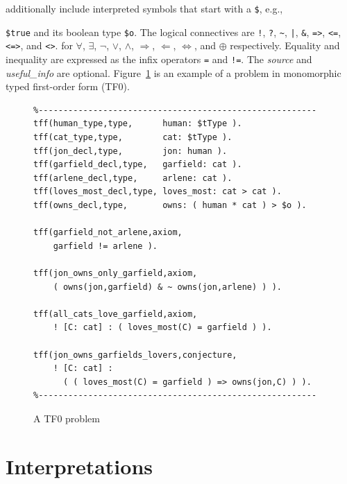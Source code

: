 \documentclass[letterpaper]{article}
\newcommand{\smalltt}[1]{\small \texttt{#1}}
\begin{document}
additionally include interpreted symbols that start with a {\tt \$}, e.g., {\smalltt{\$true} and
its boolean type {\smalltt{\$o}}.
The logical connectives are
{\tt !}, {\tt ?}, {\tt \verb|~|}, {\tt |}, {\tt \&}, {\tt =>}, {\tt <=}, {\tt <=>}, and 
{\tt <{\raisebox{0.4ex}{\texttildelow}}>}.
for
$\forall$, $\exists$, $\neg$, $\vee$, $\wedge$, $\Rightarrow$, $\Leftarrow$, $\Leftrightarrow$, 
and $\oplus$ respectively.
Equality and inequality are expressed as the infix operators {\tt =} and {\tt !=}.
The {\em source} and {\em useful\_info} are optional.
Figure~\ref{TF0FiniteProblem} is an example of a problem in monomorphic typed first-order
form (TF0).  

\begin{figure}[htbp]
\scriptsize
{}
\begin{verbatim}
%--------------------------------------------------------
tff(human_type,type,      human: $tType ).
tff(cat_type,type,        cat: $tType ).
tff(jon_decl,type,        jon: human ).
tff(garfield_decl,type,   garfield: cat ).
tff(arlene_decl,type,     arlene: cat ).
tff(loves_most_decl,type, loves_most: cat > cat ).
tff(owns_decl,type,       owns: ( human * cat ) > $o ).

tff(garfield_not_arlene,axiom,
    garfield != arlene ).

tff(jon_owns_only_garfield,axiom,
    ( owns(jon,garfield) & ~ owns(jon,arlene) ) ).

tff(all_cats_love_garfield,axiom,
    ! [C: cat] : ( loves_most(C) = garfield ) ).

tff(jon_owns_garfields_lovers,conjecture,
    ! [C: cat] : 
      ( ( loves_most(C) = garfield ) => owns(jon,C) ) ).
%--------------------------------------------------------
\end{verbatim}
\caption{A TF0 problem
}
\label{TF0FiniteProblem}
\end{figure}

\section{Interpretations}
\label{Interpretations}

}
\end{document}
